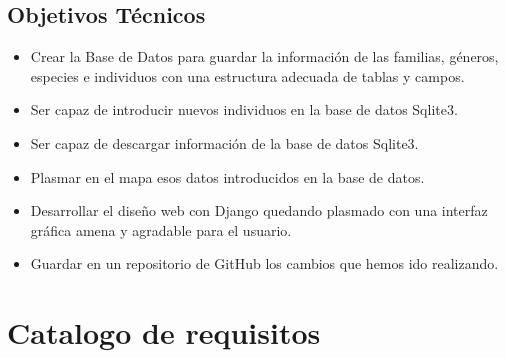 	\subsection{Objetivos Técnicos}
		\begin{itemize}
			\item Crear la Base de Datos para guardar la información de las familias, géneros, especies e individuos con una estructura adecuada de tablas y campos.
			\item Ser capaz de introducir nuevos individuos en la base de datos Sqlite3.
			\item Ser capaz de descargar información de la base de datos Sqlite3.
			\item Plasmar en el mapa esos datos introducidos en la base de datos. 
			\item Desarrollar el diseño web con Django quedando plasmado con una interfaz gráfica amena y agradable para el usuario.
			\item Guardar en un repositorio de GitHub los cambios que hemos ido realizando.	
		\end{itemize}

\section{Catalogo de requisitos}
